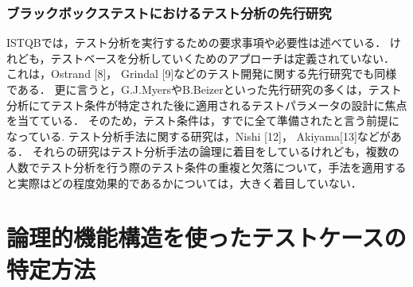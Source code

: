 \documentclass[a4paper,12pt]{jreport}
\begin{document}
\subsection{ブラックボックステストにおけるテスト分析の先行研究}
ISTQBでは，テスト分析を実行するための要求事項や必要性は述べている．
けれども，テストベースを分析していくためのアプローチは定義されていない．
これは，Ostrand [8]， Grindal [9]などのテスト開発に関する先行研究でも同様である．
更に言うと，G.J.MyersやB.Beizerといった先行研究の多くは，テスト分析にてテスト条件が特定された後に適用されるテストパラメータの設計に焦点を当てている．
そのため，テスト条件は，すでに全て準備されたと言う前提になっている.
テスト分析手法に関する研究は，Nishi [12]， Akiyama[13]などがある．
それらの研究はテスト分析手法の論理に着目をしているけれども，複数の人数でテスト分析を行う際のテスト条件の重複と欠落について，手法を適用すると実際はどの程度効果的であるかについては，大きく着目していない．


\chapter{論理的機能構造を使ったテストケースの特定方法}

\end{document}
